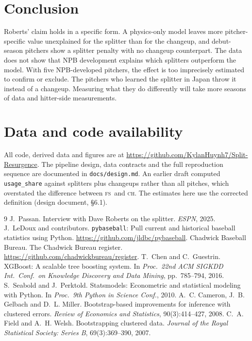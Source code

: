 \documentclass[11pt]{article}
\newcommand{\code}[1]{\texttt{#1}}
\newcommand{\FS}{\textsc{fs}}
\newcommand{\CH}{\textsc{ch}}
\begin{document}
\section{Conclusion}

Roberts' claim holds in a specific form. A physics-only model leaves more pitcher-specific value unexplained for the splitter than for the changeup, and debut-season pitchers show a splitter penalty with no changeup counterpart. The data does not show that NPB development explains which splitters outperform the model. With five NPB-developed pitchers, the effect is too imprecisely estimated to confirm or exclude. The pitchers who learned the splitter in Japan throw it instead of a changeup. Measuring what they do differently will take more seasons of data and hitter-side measurements.

\section*{Data and code availability}

All code, derived data and figures are at \url{https://github.com/KylanHuynh7/Split-Resurgence}. The pipeline design, data contracts and the full reproduction sequence are documented in \code{docs/design.md}. An earlier draft computed \code{usage\_share} against splitters plus changeups rather than all pitches, which overstated the difference between \FS\ and \CH. The estimates here use the corrected definition (design document, \S6.1).

\begin{thebibliography}{9}\small
{} J.~Passan. Interview with Dave Roberts on the splitter. \emph{ESPN}, 2025.
 J.~LeDoux and contributors. \code{pybaseball}: Pull current and historical baseball statistics using Python. \url{https://github.com/jldbc/pybaseball}.
 Chadwick Baseball Bureau. The Chadwick Bureau register. \url{https://github.com/chadwickbureau/register}.
 T.~Chen and C.~Guestrin. XGBoost: A scalable tree boosting system. In \emph{Proc.\ 22nd ACM SIGKDD Int.\ Conf.\ on Knowledge Discovery and Data Mining}, pp.\ 785--794, 2016.
 S.~Seabold and J.~Perktold. Statsmodels: Econometric and statistical modeling with Python. In \emph{Proc.\ 9th Python in Science Conf.}, 2010.
 A.~C. Cameron, J.~B. Gelbach and D.~L. Miller. Bootstrap-based improvements for inference with clustered errors. \emph{Review of Economics and Statistics}, 90(3):414--427, 2008.
 C.~A. Field and A.~H. Welsh. Bootstrapping clustered data. \emph{Journal of the Royal Statistical Society: Series B}, 69(3):369--390, 2007.
\end{thebibliography}
\end{document}
